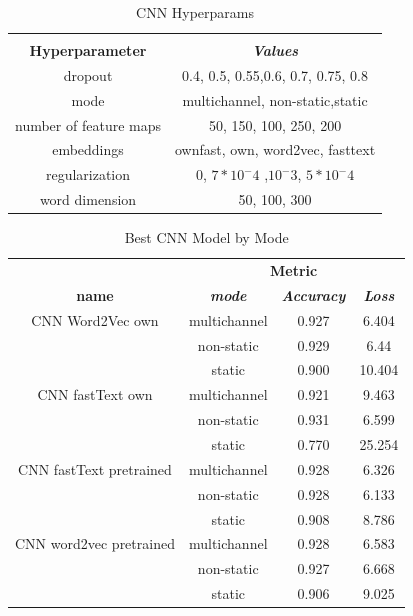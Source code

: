 \documentclass[conference]{IEEEtran}
\begin{document}
\begin{table}[htbp]
\caption{CNN Hyperparams}
\begin{center}
\begin{tabular}{|c|c|}
\hline
\textbf{}&\multicolumn{1}{|c|}{\textbf{}} \\ 
\cline{2-2}
\textbf{Hyperparameter} & \textbf{\textit{Values}} \\ 
\hline
dropout & 0.4, 0.5, 0.55,0.6, 0.7,  0.75, 0.8\\ 
\hline
mode & multichannel, non-static,static \\ 
\hline
number of feature maps & 50, 150, 100, 250, 200 \\ 
\hline
embeddings & ownfast, own, word2vec, fasttext \\ 
\hline
regularization & 0, $7*10^-4$ ,$10^-3$, $5*10^-4$ \\ 
\hline
word dimension & 50, 100, 300 \\ 
\hline
\end{tabular}
\label{tabahp}
\end{center}
\end{table}

\begin{table}[htbp]
\caption{Best CNN Model by Mode}
\begin{center}
\begin{tabular}{|c|c|c|c|}
\hline
\textbf{}&\multicolumn{3}{|c|}{\textbf{Metric}} \\ 
\cline{2-4}
\textbf{name} & \textbf{\textit{mode}}& \textbf{\textit{Accuracy}}& \textbf{\textit{Loss}} \\ 
\hline
CNN Word2Vec own & multichannel & 0.927 & 6.404 \\ 
\cline{2-4}
 & non-static & 0.929 & 6.44 \\ 
\cline{2-4}
 & static & 0.900 & 10.404 \\ 
\hline
CNN fastText own & multichannel & 0.921 & 9.463 \\ 
\cline{2-4}
 & non-static & 0.931 & 6.599 \\ 
\cline{2-4}
& static & 0.770 & 25.254 \\ 
\hline
CNN fastText pretrained & multichannel & 0.928 & 6.326 \\ 
\cline{2-4}
 & non-static & 0.928 & 6.133 \\ 
\cline{2-4}
 & static & 0.908 & 8.786 \\ 
\hline
CNN word2vec pretrained & multichannel & 0.928 & 6.583 \\ 
\cline{2-4}
& non-static & 0.927 & 6.668 \\ 
\cline{2-4}
& static & 0.906 & 9.025 \\ 
\hline
\end{tabular}
\label{taba1}
\end{center}
\end{table}
\end{document}
